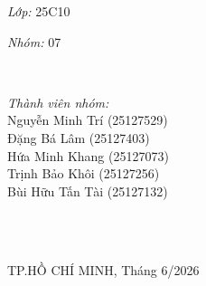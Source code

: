 \begin{titlepage}
\begin{minipage}[t]{0.4\textwidth}
\begin{flushleft}
\hspace*{-1cm}\emph{Lớp:}
25C10

\hspace*{-1cm}\emph{Nhóm:}
07

\end{flushleft}
\end{minipage}
~
\begin{minipage}[t]{0.4\textwidth}
\begin{flushright} \large
\emph{Thành viên nhóm:} \\
Nguyễn Minh Trí (25127529)\\
Đặng Bá Lâm (25127403)\\
Hứa Minh Khang (25127073)\\
Trịnh Bảo Khôi (25127256)\\ 
Bùi Hữu Tấn Tài (25127132)\\
 \\
\end{flushright}
\end{minipage}\\[2cm]

\begin{minipage}[t]{0.4\textwidth}
\begin{flushright} \large

\end{flushright}
\end{minipage}

\centering
{\hspace*{-1cm}\large TP.HỒ CHÍ MINH, Tháng 6/2026}\\[1cm]

\vfill
\end{titlepage}